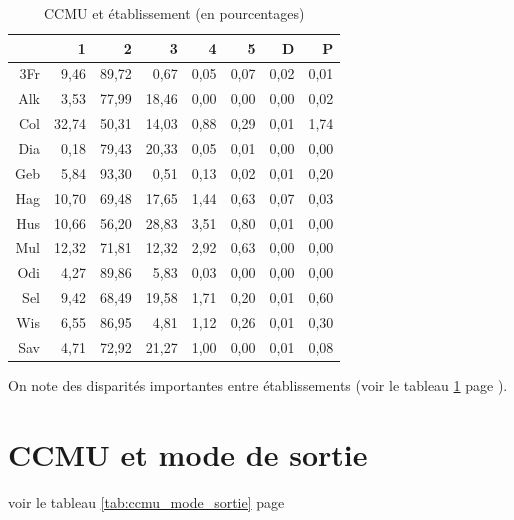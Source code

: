 \documentclass[12pt,english,french,twoside]{book}\usepackage[]{graphicx}\usepackage[]{color}
\begin{document}
\begin{table}[ht]
\centering
\begin{tabular}{rrrrrrrr}
  \hline
 & 1 & 2 & 3 & 4 & 5 & D & P \\ 
  \hline
3Fr & 9,46 & 89,72 & 0,67 & 0,05 & 0,07 & 0,02 & 0,01 \\ 
  Alk & 3,53 & 77,99 & 18,46 & 0,00 & 0,00 & 0,00 & 0,02 \\ 
  Col & 32,74 & 50,31 & 14,03 & 0,88 & 0,29 & 0,01 & 1,74 \\ 
  Dia & 0,18 & 79,43 & 20,33 & 0,05 & 0,01 & 0,00 & 0,00 \\ 
  Geb & 5,84 & 93,30 & 0,51 & 0,13 & 0,02 & 0,01 & 0,20 \\ 
  Hag & 10,70 & 69,48 & 17,65 & 1,44 & 0,63 & 0,07 & 0,03 \\ 
  Hus & 10,66 & 56,20 & 28,83 & 3,51 & 0,80 & 0,01 & 0,00 \\ 
  Mul & 12,32 & 71,81 & 12,32 & 2,92 & 0,63 & 0,00 & 0,00 \\ 
  Odi & 4,27 & 89,86 & 5,83 & 0,03 & 0,00 & 0,00 & 0,00 \\ 
  Sel & 9,42 & 68,49 & 19,58 & 1,71 & 0,20 & 0,01 & 0,60 \\ 
  Wis & 6,55 & 86,95 & 4,81 & 1,12 & 0,26 & 0,01 & 0,30 \\ 
  Sav & 4,71 & 72,92 & 21,27 & 1,00 & 0,00 & 0,01 & 0,08 \\ 
   \hline
\end{tabular}
\caption[CCMU et établissement ]{CCMU et établissement (en pourcentages)} 
\label{tab:ccmu_finess_p}
\end{table}


On note des disparités importantes entre établissements (voir le tableau \ref{tab:ccmu_finess_p} page \pageref{tab:ccmu_finess_p}).

\section{CCMU et mode de sortie}

voir le tableau \ref{tab:ccmu_mode_sortie} page \pageref{tab:ccmu_mode_sortie}
\end{document}
